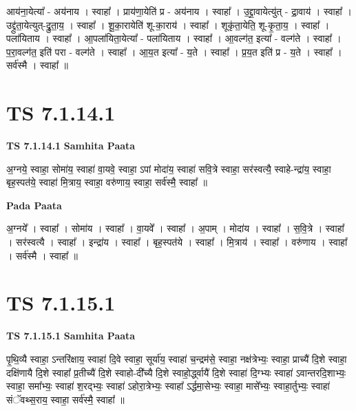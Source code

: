 \documentclass[17pt]{extarticle}
\begin{document}
आय॑ना॒येत्या᳚ - अय॑नाय । स्वाहा᳚ । प्राय॑णा॒येति॑ प्र - अय॑नाय । स्वाहा᳚ । उ॒द्द्रा॒वायेत्यु॑त् - द्रा॒वाय॑ । स्वाहा᳚ । उद्द्रु॑ता॒येत्युत्-द्रु॒ता॒य॒ । स्वाहा᳚ । शू॒का॒रायेति॑ शू-का॒राय॑ । स्वाहा᳚ । शूकृ॑ता॒येति॒ शू-कृ॒ता॒य॒ । स्वाहा᳚ । पला॑यिताय । स्वाहा᳚ । आ॒पला॑यिता॒येत्या᳚ - पला॑यिताय । स्वाहा᳚ । आ॒वल्ग॑त॒ इत्या᳚ - वल्ग॑ते । स्वाहा᳚ । प॒रा॒वल्ग॑त॒ इति॑ परा - वल्ग॑ते । स्वाहा᳚ । आ॒य॒त इत्या᳚ - य॒ते । स्वाहा᳚ । प्र॒य॒त इति॑ प्र - य॒ते । स्वाहा᳚ । सर्व॑स्मै । स्वाहा᳚ ॥  \newline




\section*{ TS 7.1.14.1 }

\textbf{TS 7.1.14.1 } \newline
\textbf{Samhita Paata} \newline

अ॒ग्नये॒ स्वाहा॒ सोमा॑य॒ स्वाहा॑ वा॒यवे॒ स्वाहा॒ ऽपां मोदा॑य॒ स्वाहा॑ सवि॒त्रे स्वाहा॒ सर॑स्वत्यै॒ स्वाहे-न्द्रा॑य॒ स्वाहा॒ बृह॒स्पत॑ये॒ स्वाहा॑ मि॒त्राय॒ स्वाहा॒ वरु॑णाय॒ स्वाहा॒ सर्व॑स्मै॒ स्वाहा᳚ ॥ \newline

\textbf{Pada Paata} \newline

अ॒ग्नये᳚ । स्वाहा᳚ । सोमा॑य । स्वाहा᳚ । वा॒यवे᳚ । स्वाहा᳚ । अ॒पाम् । मोदा॑य । स्वाहा᳚ । स॒वि॒त्रे । स्वाहा᳚ । सर॑स्वत्यै । स्वाहा᳚ । इन्द्रा॑य । स्वाहा᳚ । बृह॒स्पत॑ये । स्वाहा᳚ । मि॒त्राय॑ । स्वाहा᳚ । वरु॑णाय । स्वाहा᳚ । सर्व॑स्मै । स्वाहा᳚ ॥  \newline




\section*{ TS 7.1.15.1 }

\textbf{TS 7.1.15.1 } \newline
\textbf{Samhita Paata} \newline

पृ॒थि॒व्यै स्वाहा॒ ऽन्तरि॑क्षाय॒ स्वाहा॑ दि॒वे स्वाहा॒ सूर्या॑य॒ स्वाहा॑ च॒न्द्रम॑से॒ स्वाहा॒ नक्ष॑त्रेभ्यः॒ स्वाहा॒ प्राच्यै॑ दि॒शे स्वाहा॒ दक्षि॑णायै दि॒शे स्वाहा᳚ प्र॒तीच्यै॑ दि॒शे स्वाहो-दी᳚च्यै दि॒शे स्वाहो॒र्द्ध्वायै॑ दि॒शे स्वाहा॑ दि॒ग्भ्यः स्वाहा॑ ऽवान्तरदि॒शाभ्यः॒ स्वाहा॒ समा᳚भ्यः॒ स्वाहा॑ श॒रद्भ्यः॒ स्वाहा॑ ऽहोरा॒त्रेभ्यः॒ स्वाहा᳚ ऽर्द्धमा॒सेभ्यः॒ स्वाहा॒ मासे᳚भ्यः॒ स्वाहा॒र्तुभ्यः॒ स्वाहा॑ संॅवथ्स॒राय॒ स्वाहा॒ सर्व॑स्मै॒ स्वाहा᳚ ॥ \newline
\end{document}
